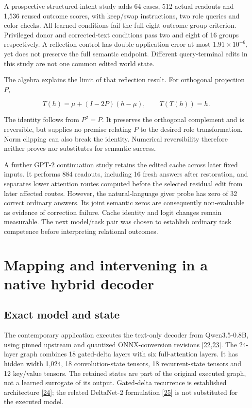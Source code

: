 \documentclass[11pt,letterpaper]{article}
\begin{document}
A prospective structured-intent study adds 64 cases, 512 actual readouts and 1,536 reused outcome scores, with keep/swap instructions, two role queries and color checks. All learned conditions fail the full eight-outcome group criterion. Privileged donor and corrected-text conditions pass two and eight of 16 groups respectively. A reflection control has double-application error at most \(1.91\times10^{-6}\), yet does not preserve the full semantic endpoint. Different query-terminal edits in this study are not one common edited world state.

The algebra explains the limit of that reflection result. For orthogonal projection \(P\),

\begin{equation}
T(h)=\mu+(I-2P)(h-\mu),\qquad T(T(h))=h. \tag{8}
\end{equation}

The identity follows from \(P^2=P\). It preserves the orthogonal complement and is reversible, but supplies no premise relating \(P\) to the desired role transformation. Norm clipping can also break the identity. Numerical reversibility therefore neither proves nor substitutes for semantic success.

A further GPT-2 continuation study retains the edited cache across later fixed inputs. It performs 884 readouts, including 16 fresh answers after restoration, and separates lower attention routes computed before the selected residual edit from later affected routes. However, the natural-language giver probe has zero of 32 correct ordinary answers. Its joint semantic zeros are consequently non-evaluable as evidence of correction failure. Cache identity and logit changes remain measurable. The next model/task pair was chosen to establish ordinary task competence before interpreting relational outcomes.

\section{Mapping and intervening in a native hybrid decoder}

\subsection{Exact model and state}

The contemporary application executes the text-only decoder from Qwen3.5-0.8B, using pinned upstream and quantized ONNX-conversion revisions [\hyperref[ref:22]{22},\hyperref[ref:23]{23}]. The 24-layer graph combines 18 gated-delta layers with six full-attention layers. It has hidden width 1,024, 18 convolution-state tensors, 18 recurrent-state tensors and 12 key/value tensors. The retained states are part of the original executed graph, not a learned surrogate of its output. Gated-delta recurrence is established architecture [\hyperref[ref:24]{24}]; the related DeltaNet-2 formulation [\hyperref[ref:25]{25}] is not substituted for the executed model.
\end{document}
